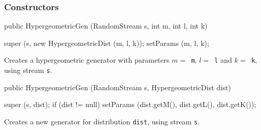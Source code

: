 \subsubsection* {Constructors}
\begin{code}

   public HypergeometricGen (RandomStream s, int m, int l, int k) \begin{hide} {
      super (s, new HypergeometricDist (m, l, k));
      setParams (m, l, k);
   }\end{hide}
\end{code}
  \begin{tabb}  Creates a hypergeometric generator with
   parameters $m = $~\texttt{m}, $l = $~\texttt{l} and $k = $~\texttt{k},
   using stream \texttt{s}. 
 \end{tabb}
\begin{code}

   public HypergeometricGen (RandomStream s, HypergeometricDist dist) \begin{hide} {
      super (s, dist);
      if (dist != null)
         setParams (dist.getM(), dist.getL(), dist.getK());
   }\end{hide}
\end{code}
  \begin{tabb} Creates a new generator for distribution \texttt{dist},
    using stream \texttt{s}. 
 \end{tabb}


